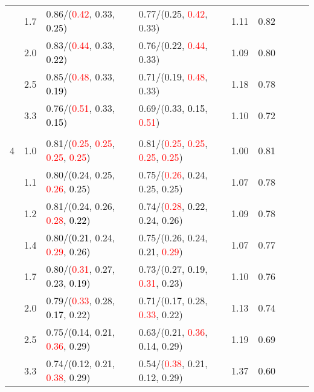 \documentclass[10pt,a4paper]{report}
\begin{document}
\begin{table}[!htbp]
\begin{center}
{\begin{tabular}{ccllccccc}
			&1.7&0.86/(\textcolor{red}{0.42}, 0.33, \textcolor{black}{0.25})&0.77/(\textcolor{black}{0.25}, \textcolor{red}{0.42}, 0.33)&1.11&0.82\\
			&2.0&0.83/(\textcolor{red}{0.44}, 0.33, \textcolor{black}{0.22})&0.76/(\textcolor{black}{0.22}, \textcolor{red}{0.44}, 0.33)&1.09&0.80\\
			&2.5&0.85/(\textcolor{red}{0.48}, 0.33, \textcolor{black}{0.19})&0.71/(\textcolor{black}{0.19}, \textcolor{red}{0.48}, 0.33)&1.18&0.78\\
			&3.3&0.76/(\textcolor{red}{0.51}, 0.33, \textcolor{black}{0.15})&0.69/(0.33, \textcolor{black}{0.15}, \textcolor{red}{0.51})&1.10&0.72\\
			&&&&\\
			4			&1.0&0.81/(\textcolor{red}{0.25}, \textcolor{red}{0.25}, \textcolor{red}{0.25}, \textcolor{red}{0.25})&0.81/(\textcolor{red}{0.25}, \textcolor{red}{0.25}, \textcolor{red}{0.25}, \textcolor{red}{0.25})&1.00&0.81\\
			&1.1&0.80/(\textcolor{black}{0.24}, 0.25, \textcolor{red}{0.26}, 0.25)&0.75/(\textcolor{red}{0.26}, \textcolor{black}{0.24}, 0.25, 0.25)&1.07&0.78\\
			&1.2&0.81/(0.24, 0.26, \textcolor{red}{0.28}, \textcolor{black}{0.22})&0.74/(\textcolor{red}{0.28}, \textcolor{black}{0.22}, 0.24, 0.26)&1.09&0.78\\
			&1.4&0.80/(\textcolor{black}{0.21}, 0.24, \textcolor{red}{0.29}, 0.26)&0.75/(0.26, 0.24, \textcolor{black}{0.21}, \textcolor{red}{0.29})&1.07&0.77\\
			&1.7&0.80/(\textcolor{red}{0.31}, 0.27, 0.23, \textcolor{black}{0.19})&0.73/(0.27, \textcolor{black}{0.19}, \textcolor{red}{0.31}, 0.23)&1.10&0.76\\
			&2.0&0.79/(\textcolor{red}{0.33}, 0.28, \textcolor{black}{0.17}, 0.22)&0.71/(\textcolor{black}{0.17}, 0.28, \textcolor{red}{0.33}, 0.22)&1.13&0.74\\
			&2.5&0.75/(\textcolor{black}{0.14}, 0.21, \textcolor{red}{0.36}, 0.29)&0.63/(0.21, \textcolor{red}{0.36}, \textcolor{black}{0.14}, 0.29)&1.19&0.69\\
			&3.3&0.74/(\textcolor{black}{0.12}, 0.21, \textcolor{red}{0.38}, 0.29)&0.54/(\textcolor{red}{0.38}, 0.21, \textcolor{black}{0.12}, 0.29)&1.37&0.60\\
			\bottomrule
		\end{tabular}}
	\end{center}
\end{table}
\end{document}
